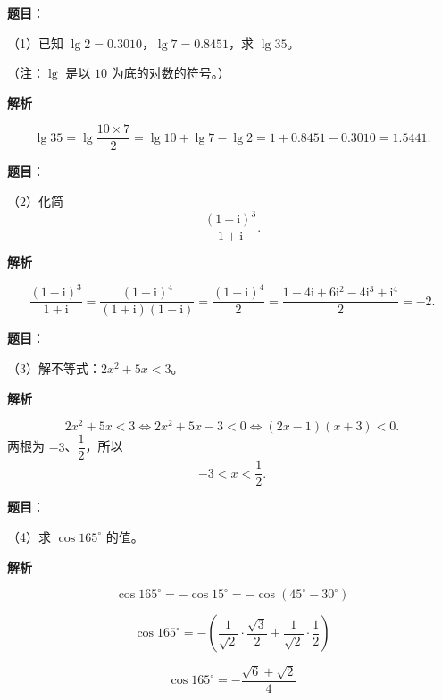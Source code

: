 


\begin{answer}

\textbf{题目}：

（1）已知 $\lg2=0.3010$，$\lg7=0.8451$，求 $\lg35$。

（注：$\lg$ 是以 $10$ 为底的对数的符号。）

\textbf{解析}

\nopagebreak[4]
\[
\lg35=\lg\frac{10\times7}{2}=\lg10+\lg7-\lg2=1+0.8451-0.3010=1.5441.
\]


\end{answer}
\begin{answer}

\textbf{题目}：

（2）化简
\nopagebreak[4]
\[
\frac{(1-\mathrm i)^3}{1+\mathrm i}.
\]

\textbf{解析}

\nopagebreak[4]
\[
\frac{(1-\mathrm i)^3}{1+\mathrm i}
=\frac{(1-\mathrm i)^4}{(1+\mathrm i)(1-\mathrm i)}
=\frac{(1-\mathrm i)^4}{2}
=\frac{1-4\mathrm i+6\mathrm i^2-4\mathrm i^3+\mathrm i^4}{2}
=-2.
\]


\end{answer}
\begin{answer}

\textbf{题目}：

（3）解不等式：$2x^2+5x<3$。

\textbf{解析}

\nopagebreak[4]
\[
2x^2+5x<3
\iff 2x^2+5x-3<0
\iff(2x-1)(x+3)<0.
\]
两根为 $-3$、$\dfrac12$，所以
\nopagebreak[4]
\[
-3<x<\frac12.
\]


\end{answer}
\begin{answer}

\textbf{题目}：

（4）求 $\cos165^\circ$ 的值。

\textbf{解析}

\nopagebreak[4]
\[
\cos165^\circ=-\cos15^\circ=-\cos(45^\circ-30^\circ)
\]

\nopagebreak[4]
\[
\cos165^\circ=-\left(\frac1{\sqrt2}\cdot\frac{\sqrt3}{2}+\frac1{\sqrt2}\cdot\frac12\right)
\]

\nopagebreak[4]
\[
\cos165^\circ=-\frac{\sqrt6+\sqrt2}{4}
\]


\end{answer}
